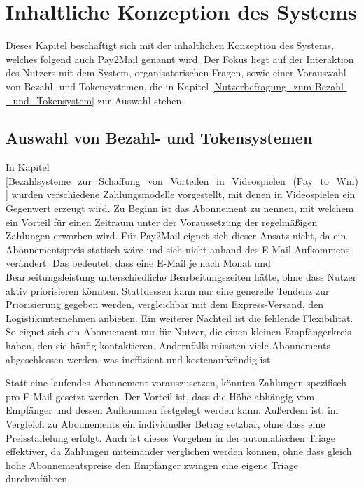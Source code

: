 
\chapter{Inhaltliche Konzeption des Systems}
\label{Inhaltliche_Konzeption_des_Systems}

Dieses Kapitel beschäftigt sich mit der inhaltlichen Konzeption des Systems, welches folgend auch Pay2Mail genannt wird. Der Fokus liegt auf der Interaktion des Nutzers mit dem System, organisatorischen Fragen, sowie einer Vorauswahl von Bezahl- und Tokensystemen, die in Kapitel \ref{Nutzerbefragung_zum Bezahl-_und_Tokensystem} zur Auswahl stehen.

\section{Auswahl von Bezahl- und Tokensystemen}
\label{Auswahl_von_Bezahl-_und_Tokensystemen}
In Kapitel \ref{Bezahlsysteme_zur_Schaffung_von_Vorteilen_in_Videospielen_(Pay_to_Win)} wurden verschiedene Zahlungsmodelle vorgestellt, mit denen in Videospielen ein Gegenwert erzeugt wird. Zu Beginn ist das Abonnement zu nennen, mit welchem ein Vorteil für einen Zeitraum unter der Voraussetzung der regelmäßigen Zahlungen erworben wird. Für Pay2Mail eignet sich dieser Ansatz nicht, da ein Abonnementspreis statisch wäre und sich nicht anhand des E-Mail Aufkommens verändert. Das bedeutet, dass eine E-Mail je nach Monat und Bearbeitungsleistung unterschiedliche Bearbeitungszeiten hätte, ohne dass Nutzer aktiv priorisieren könnten. Stattdessen kann nur eine generelle Tendenz zur Priorisierung gegeben werden, vergleichbar mit dem Express-Versand, den Logistikunternehmen anbieten. Ein weiterer Nachteil ist die fehlende Flexibilität. So eignet sich ein Abonnement nur für Nutzer, die einen kleinen Empfängerkreis haben, den sie häufig kontaktieren. Andernfalls müssten viele Abonnements abgeschlossen werden, was ineffizient und kostenaufwändig ist.

Statt eine laufendes Abonnement vorauszusetzen, könnten Zahlungen spezifisch pro E-Mail gesetzt werden. Der Vorteil ist, dass die Höhe abhängig vom Empfänger und dessen Aufkommen festgelegt werden kann. Außerdem ist, im Vergleich zu Abonnements ein individueller Betrag setzbar, ohne dass eine Preisstaffelung erfolgt. Auch ist dieses Vorgehen in der automatischen Triage effektiver, da Zahlungen miteinander verglichen werden können, ohne dass gleich hohe Abonnementspreise den Empfänger zwingen eine eigene Triage durchzuführen. 

